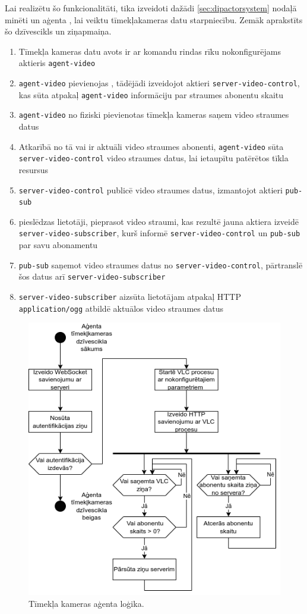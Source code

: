 Lai realizētu šo funkcionalitāti, tika izveidoti dažādi \ref{sec:dipactorsystem}
nodaļā minēti  un aģenta , lai
veiktu tīmekļakameras datu starpniecību. Zemāk aprakstīts šo
 dzīvescikls un ziņapmaiņa.

\begin{enumerate}
    \item Tīmekļa kameras datu avots ir ar komandu rindas rīku nokonfigurējams
        aktieris \lstinline!agent-video!
    \item \lstinline!agent-video! pievienojas ,
        tādējādi  izveidojot aktieri
        \lstinline!server-video-control!, kas sūta atpakaļ
        \lstinline!agent-video! informāciju par straumes abonentu skaitu
    \item \lstinline!agent-video! no fiziski pievienotas tīmekļa kameras saņem
        video straumes datus
    \item Atkarībā no tā vai ir aktuāli video straumes abonenti,
        \lstinline!agent-video! sūta \lstinline!server-video-control! video
        straumes datus, lai ietaupītu patērētos tīkla resursus
    \item {} \lstinline!server-video-control! publicē
        video straumes datus, izmantojot aktieri \lstinline!pub-sub!
    \item {} pieslēdzas lietotāji,
        pieprasot video straumi, kas rezultē jauna aktiera izveidē
        \lstinline!server-video-subscriber!, kurš informē
        \lstinline!server-video-control! un \lstinline!pub-sub! par savu
        abonamentu
    \item \lstinline!pub-sub! saņemot video straumes datus no
        \lstinline!server-video-control!, pārtranslē šos datus arī
        \lstinline!server-video-subscriber!
    \item \lstinline!server-video-subscriber! aizsūta lietotājam atpakaļ HTTP
        \lstinline!application/ogg! atbildē aktuālos video straumes datus
\end{enumerate}

\begin{figure}[H]
    \includegraphics[width=0.6\linewidth]{assets/video_engine.drawio.png}
    \centering
    \caption{Tīmekļa kameras aģenta loģika.}
    \label{fig:videoengine}
\end{figure}

